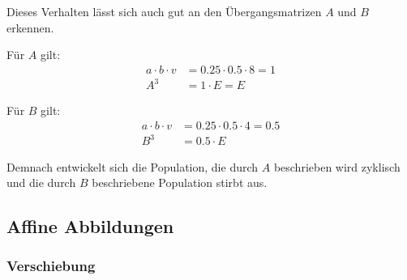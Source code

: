 \begin{flushleft}
Dieses Verhalten lässt sich auch gut an den Übergangsmatrizen $A$ und $B$ erkennen.

Für $A$ gilt:
\begin{align}
    a\cdot b\cdot v&=0.25\cdot 0.5\cdot 8=1 \\
    A^3&=1\cdot E=E
\end{align}

Für $B$ gilt:
\begin{align}
    a\cdot b\cdot v&=0.25\cdot 0.5\cdot 4=0.5 \\
    B^3&=0.5\cdot E
\end{align}

Demnach entwickelt sich die Population, die durch $A$ beschrieben wird zyklisch
und die durch $B$ beschriebene Population stirbt aus.
\end{flushleft}

\subsection{Affine Abbildungen}
\subsubsection{Verschiebung}
\begin{center}
\end{center}


